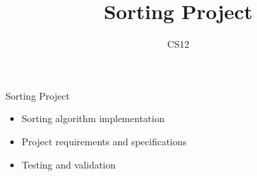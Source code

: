 \documentclass{beamer}
\title{Sorting Project}
\author{CS12}
\date{}
\begin{document}
\begin{frame}
    \titlepage
\end{frame}

\begin{frame}{Sorting Project}
    \begin{itemize}
        \item Sorting algorithm implementation
        \item Project requirements and specifications
        \item Testing and validation
    \end{itemize}
\end{frame}
\end{document}
